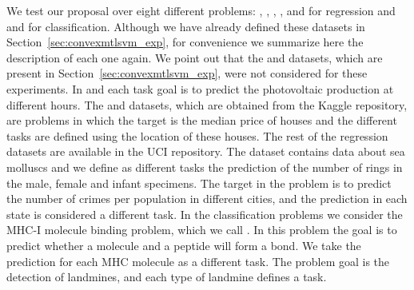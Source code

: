 We test our proposal over eight different problems: , , , ,  and  for regression and  and  for classification.
Although we have already defined these datasets in Section~\ref{sec:convexmtlsvm_exp}, for convenience we summarize here the description of each one again. We point out that the  and  datasets, which are present in Section~\ref{sec:convexmtlsvm_exp}, were not considered for these experiments.
In  and  each task goal is to predict the photovoltaic production at different hours.
The  and  datasets, which are obtained from the Kaggle repository, are problems in which the target is the median price of houses and the different tasks are defined using the location of these houses.
The rest of the regression datasets are available in the UCI repository.
The  dataset contains data about sea molluscs and we define as different tasks the prediction of the number of rings in the male, female and infant specimens.
The target in the  problem is to predict the number of crimes per population in different cities, and the prediction in each state is considered a different task. 
In the classification problems we consider the MHC-I molecule binding problem, which we call . In this problem the goal is to predict whether a molecule and a peptide will form a bond. We take the prediction for each MHC molecule as a different task.
The 
problem goal is the detection of landmines, and each type of landmine defines a task.
